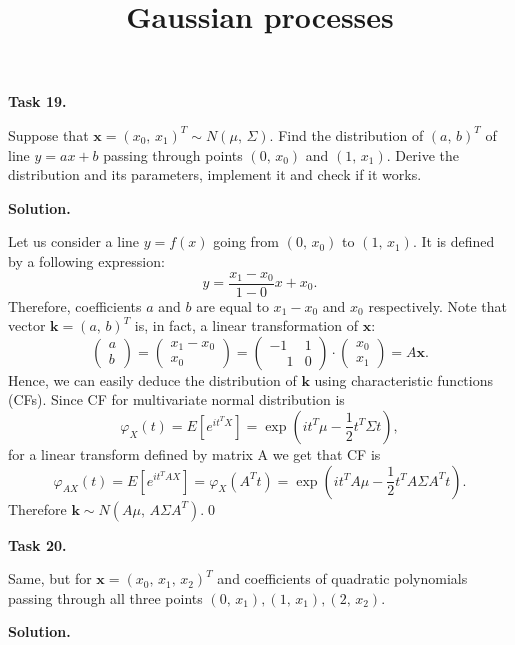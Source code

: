 \documentclass[14pt,a4paper]{extarticle}
\title{Gaussian processes}
\begin{document}
	\maketitle
	
	\noindent\textbf{Task 19.} 
	
	Suppose that $\bm{x}=(x_0,\, x_1)^T \sim N(\mu,\, \Sigma)$. Find the distribution of $(a,\, b)^T$ of line $y=ax+b$ passing through points $(0,\, x_0)$ and $(1,\, x_1)$. Derive the distribution and its parameters, implement it and check if it works.
	
	\noindent\textbf{Solution.}
	
	Let us consider a line $y = f(x)$ going from $(0,\, x_0)$ to $(1,\, x_1)$. It is defined by a following expression:
	\[y=\dfrac{x_1-x_0}{1-0}x+x_0.\]
	Therefore, coefficients $a$ and $b$ are equal to $x_1 - x_0$ and $x_0$ respectively. Note that vector $\bm{k}=(a,\,b)^T$ is, in fact, a linear transformation of $\bm{x}$:
	\[\begin{pmatrix} a\\ b\end{pmatrix}=\begin{pmatrix} x_1-x_0 \\ x_0 \end{pmatrix}=\begin{pmatrix}-1 & 1 \\ \phantom{-}1 & 0 \end{pmatrix}\cdot\begin{pmatrix}x_0 \\ x_1\end{pmatrix}=A\bm{x}.\]
	Hence, we can easily deduce the distribution of $\bm{k}$ using characteristic functions (CFs). Since CF for multivariate normal distribution is
	\[\varphi_{X}(t)=E[e^{it^TX}]=\exp\left(it^T\mu-\dfrac{1}{2}t^T\Sigma t\right),\]
	for a linear transform defined by matrix A we get that CF is
	\[\varphi_{AX}(t)=E[e^{it^TAX}]=\varphi_X(A^Tt)=\exp\left(it^TA\mu-\dfrac{1}{2}t^TA\Sigma A^Tt\right).\]
	Therefore $\bm{k} \sim N(A\mu,\, A\Sigma A^T)$.\qed
	\newpage
	
	\noindent\textbf{Task 20.}
	
	Same, but for $\bm{x}=(x_0,\, x_1,\, x_2)^T$ and coefficients of quadratic polynomials passing through all three points $(0,\, x_1), (1,\, x_1), (2,\, x_2)$.
	
	\noindent\textbf{Solution.}
	
\end{document}
